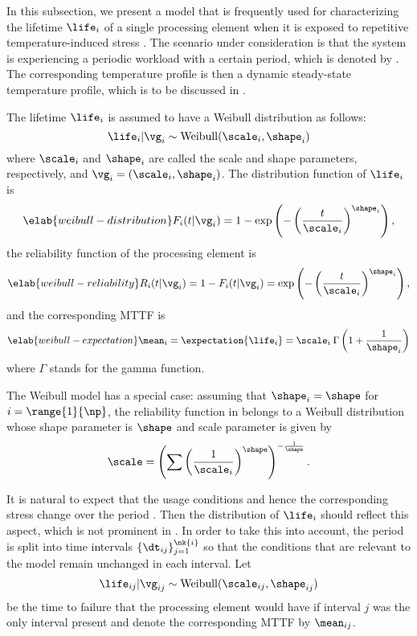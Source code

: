 In this subsection, we present a model that is frequently used for
characterizing the lifetime $\life_i$ of a single processing element when it is
exposed to repetitive temperature-induced stress \cite{huang2009b, xiang2010}.
The scenario under consideration is that the system is experiencing a periodic
workload with a certain period, which is denoted by \period. The corresponding
temperature profile is then a dynamic steady-state temperature profile, which is
to be discussed in .

The lifetime $\life_i$ is assumed to have a Weibull distribution as follows:
\[
  \life_i | \vg_i \sim \mathrm{Weibull}(\scale_i, \shape_i)
\]
where $\scale_i$ and $\shape_i$ are called the scale and shape parameters,
respectively, and $\vg_i = (\scale_i, \shape_i)$. The distribution function of
$\life_i$ is
\begin{equation} \elab{weibull-distribution}
  F_i(t | \vg_i) = 1 - \exp\left(-\left(\frac{t}{\scale_i}\right)^{\shape_i}\right),
\end{equation}
the reliability function of the processing element is
\begin{equation} \elab{weibull-reliability}
  R_i(t | \vg_i) = 1 - F_i(t | \vg_i) = \exp\left(-\left(\frac{t}{\scale_i}\right)^{\shape_i}\right),
\end{equation}
and the corresponding \ac{MTTF} is
\begin{equation} \elab{weibull-expectation}
  \mean_i = \expectation{\life_i} = \scale_i \: \Gamma\left(1 + \frac{1}{\shape_i}\right)
\end{equation}
where $\Gamma$ stands for the gamma function.

\begin{remark} 
The Weibull model has a special case: assuming that $\shape_i = \shape$ for $i =
\range{1}{\np}$, the reliability function in  belongs to
a Weibull distribution whose shape parameter is $\shape$ and scale parameter is
given by
\[
  \scale = \left(\sum\left(\frac{1}{\scale_i}\right)^\shape\right)^{-\frac{1}{\shape}}.
\]
\end{remark}

It is natural to expect that the usage conditions and hence the corresponding
stress change over the period \period. Then the distribution of $\life_i$ should
reflect this aspect, which is not prominent in . In
order to take this into account, the period is split into  time intervals
$\{ \dt_{ij} \}_{j = 1}^{\nk{i}}$ so that the conditions that are relevant to
the model remain unchanged in each interval. Let
\[
  \life_{ij} | \vg_{ij} \sim \mathrm{Weibull}(\scale_{ij}, \shape_{ij})
\]
be the time to failure that the processing element would have if interval $j$
was the only interval present and denote the corresponding \ac{MTTF} by
$\mean_{ij}$.

